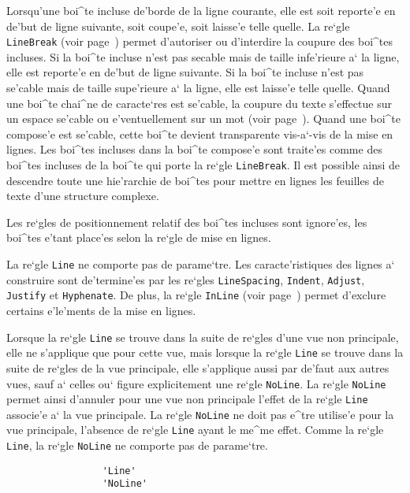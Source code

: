 {Lorsqu'une boi^te incluse de'borde de la ligne courante, elle est soit reporte'e
en de'but de ligne suivante, soit coupe'e, soit laisse'e telle quelle.
La re`gle {\tt LineBreak} (voir page~\pageref{condcoupure}) permet d'autoriser
ou d'interdire la coupure des boi^tes incluses.
Si la boi^te incluse n'est pas secable mais de taille infe'rieure a` la ligne,
elle est reporte'e en de'but de ligne suivante.
Si la boi^te incluse n'est pas se'cable mais de taille supe'rieure a` la ligne,
elle est laisse'e telle quelle.
Quand une boi^te chai^ne de caracte`res est se'cable, la coupure du texte
s'effectue sur un espace se'cable ou e'ventuellement sur un mot
(voir page~\pageref{reglehyphenate}).
Quand une boi^te compose'e est se'cable, cette boi^te devient transparente
vis-a`-vis de la mise en lignes.
Les boi^tes incluses dans la boi^te compose'e sont traite'es comme des
boi^tes incluses de la boi^te qui porte la re`gle {\tt LineBreak}.
Il est possible ainsi de descendre toute une hie'rarchie de boi^tes pour mettre
en lignes les feuilles de texte d'une structure complexe.

Les re`gles de positionnement relatif des boi^tes incluses sont ignore'es,
les boi^tes e'tant place'es selon la re`gle de mise en lignes.

La re`gle {\tt Line} ne comporte pas de parame`tre. Les caracte'ristiques
des lignes a` construire sont de'termine'es
par les re`gles {\tt LineSpacing}, {\tt Indent}, {\tt Adjust}, {\tt Justify}
et {\tt Hyphenate}.
De plus, la re`gle {\tt InLine} (voir page~\pageref{regleinline}) permet
d'exclure certains e'le'ments de la mise en lignes.

Lorsque la re`gle {\tt Line} se trouve dans la suite de re`gles d'une vue
non principale, elle ne s'applique que pour cette vue, mais
lorsque la re`gle {\tt Line} se trouve dans la suite de re`gles de la vue
principale, elle s'applique aussi par de'faut aux autres vues,
sauf a` celles ou` figure explicitement une re`gle {\tt NoLine}.
La re`gle {\tt NoLine} permet ainsi d'annuler pour une vue non principale
l'effet de la re`gle {\tt Line} associe'e a` la vue principale.
La re`gle {\tt NoLine} ne doit pas e^tre utilise'e pour la vue principale,
l'absence de re`gle {\tt Line} ayant le me^me effet.
Comme la re`gle {\tt Line}, la re`gle {\tt NoLine} ne comporte pas de
parame`tre.

\begin{verbatim}
                 'Line'
                 'NoLine'
\end{verbatim}

}
